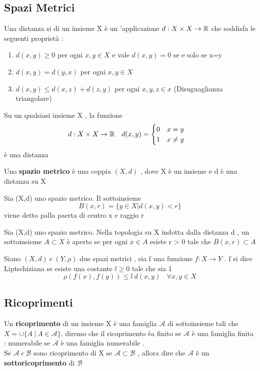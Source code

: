 \subsection{Spazi Metrici}
\begin{definizione}
	Una distanza si di un insieme X è un 'applicazione $d: X \times X \rightarrow \mathbb{R}$ che soddisfa le seguenti proprietà : 
	\begin{enumerate}
		\item $d(x,y) \geq 0 $ per ogni $x,y \in X$ e vale $d(x,y)=0$ se e solo se x=y 
		\item $d(x,y)=d(y,x)$ per ogni $x,y \in X$ 
		\item $d(x,y) \leq d(x,z)+d(z,y) $ per ogni $x,y,z \in x$ (Disuguaglianza triangolare)
	\end{enumerate}
\end{definizione}
	\begin{es}
		Su un qualsiasi insieme X , la funzione 
		$$d: X \times X \rightarrow \mathbb{R}  \ \ \ d(x,y)= \begin{cases}
			0 \ \ \ x = y \\
			1 \ \ \ x \neq y 
		\end{cases}$$
		è una distanza 
	\end{es}
	\begin{definizione}
	Uno \textbf{spazio metrico} è una coppia $(X,d)$ , dove X è un insieme e d è una distanza su X 
	\end{definizione}
	\begin{definizione}
		Sia (X,d) uno spazio metrico. Il sottoinsieme 
		$$B(x,r) = \{y \in X | d(x,y)<r\}$$ viene detto palla paerta di centro x e raggio r 
	\end{definizione}
	\begin{definizione}Sia (X,d) uno spazio metrico. Nella topologia su X indotta dalla distanza d , un sottoinsieme $A \subset X$ è aperto se per ogni $x \in A $ esiste r > 0 tale che $B(x,r) \subset A $
	\end{definizione}
\begin{definizione}
	Siano $(X, d ) \ e \ (Y , \rho)$ due spazi metrici , sia f una funzione $f : X \rightarrow Y$ . f si dice Liptschiziana se esiste una costante $l \geq 0 $ tale che sia 
1	$$\rho(f(x),f(y)) \leq l \  d(x,y) \ \ \ \ \forall x , y \in X$$
\end{definizione}
\subsection{Ricoprimenti}
\begin{definizione}
	Un \textbf{ricoprimento} di un insieme X è una famiglia $\mathcal{A}$ di sottoinsieme tali che $X = \cup \{A \ | \ A \in \mathcal{A}\}$. diremo che il ricoprimento èa finito se $\mathcal{A}$ è una famiglia finita : numerabile se $\mathcal{A}$ è una famiglia numerabile . \\
	Se $\mathcal{A} \ e \ \mathcal{B}$ sono ricoprimento di X se $\mathcal{A} \subset \mathcal{B}$ , allora dire che $\mathcal{A}$ è un \textbf{sottoricoprimento } di $\mathcal{B}$
  \end{definizione}